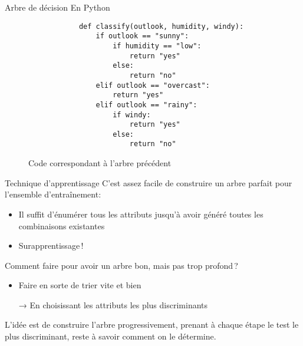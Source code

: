 \documentclass[hyperref={unicode}, xcolor={svgnames}, french]{beamer}
\newcommand{\itpause}{%
	\addtocounter{beamerpauses}{-1}%
	\pause
}
\begin{document}
\begin{frame}[fragile]{Arbre de décision}
    En Python
    \begin{figure}
        \begin{verbatim}
            def classify(outlook, humidity, windy):
                if outlook == "sunny":
                    if humidity == "low":
                        return "yes"
                    else:
                        return "no"
                elif outlook == "overcast":
                    return "yes"
                elif outlook == "rainy":
                    if windy:
                        return "yes"
                    else:
                        return "no"
        \end{verbatim}
        \caption{Code correspondant à l'arbre précédent}
    \end{figure}
\end{frame}

\begin{frame}{Technique d'apprentissage}
    C'est assez facile de construire un arbre parfait pour l'ensemble d'entraînement:

    \begin{itemize}
        \item<+-> Il suffit d'énumérer tous les attributs jusqu'à avoir généré toutes les combinaisons existantes
        \item<+->[→] Surapprentissage ! %
    \end{itemize}
	\itpause
    Comment faire pour avoir un arbre bon, mais pas trop profond ?
    \pause
    \begin{itemize}
        \item Faire en sorte de trier vite et bien
        \item[→] En choisissant les attributs les plus discriminants
    \end{itemize}
    L'idée est de construire l'arbre progressivement, prenant à chaque étape le test le plus \alert{discriminant}, reste à savoir comment on le détermine.
\end{frame}
\end{document}

